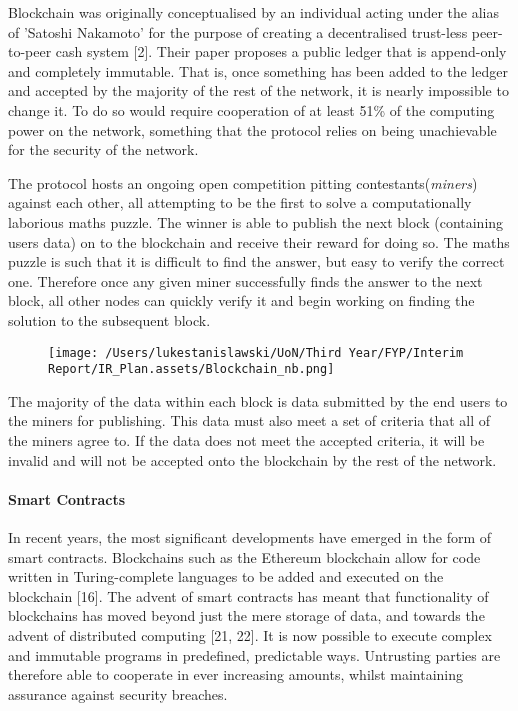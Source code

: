 \documentclass[]{article}
\let\oldparagraph\paragraph
\renewcommand{\paragraph}[1]{\oldparagraph{#1}\mbox{}}
\begin{document}
Blockchain was originally conceptualised by an individual acting under
the alias of 'Satoshi Nakamoto' for the purpose of creating a
decentralised trust-less peer-to-peer cash system {[}2{]}. Their paper
proposes a public ledger that is append-only and completely immutable.
That is, once something has been added to the ledger and accepted by the
majority of the rest of the network, it is nearly impossible to change
it. To do so would require cooperation of at least 51\% of the computing
power on the network, something that the protocol relies on being
unachievable for the security of the network.

The protocol hosts an ongoing open competition pitting
contestants(\emph{miners}) against each other, all attempting to be the
first to solve a computationally laborious maths puzzle. The winner is
able to publish the next block (containing users data) on to the
blockchain and receive their reward for doing so. The maths puzzle is
such that it is difficult to find the answer, but easy to verify the
correct one. Therefore once any given miner successfully finds the
answer to the next block, all other nodes can quickly verify it and
begin working on finding the solution to the subsequent block.

\begin{figure}
\centering
\texttt{[image: /Users/lukestanislawski/UoN/Third Year/FYP/Interim Report/IR\_Plan.assets/Blockchain\_nb.png]}
\caption{}
\end{figure}

The majority of the data within each block is data submitted by the end
users to the miners for publishing. This data must also meet a set of
criteria that all of the miners agree to. If the data does not meet the
accepted criteria, it will be invalid and will not be accepted onto the
blockchain by the rest of the network.

\hypertarget{header-n16}{%
\paragraph{Smart Contracts}\label{header-n16}}

In recent years, the most significant developments have emerged in the
form of smart contracts. Blockchains such as the Ethereum blockchain
allow for code written in Turing-complete languages to be added and
executed on the blockchain {[}16{]}. The advent of smart contracts has
meant that functionality of blockchains has moved beyond just the mere
storage of data, and towards the advent of distributed computing {[}21,
22{]}. It is now possible to execute complex and immutable programs in
predefined, predictable ways. Untrusting parties are therefore able to
cooperate in ever increasing amounts, whilst maintaining assurance
against security breaches.
\end{document}
